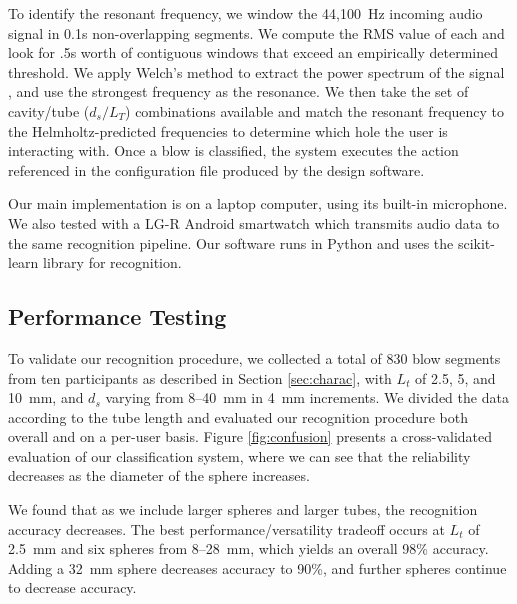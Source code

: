       To identify the resonant frequency, we window the 44,100~Hz incoming audio
      signal in 0.1s non-overlapping segments. We compute the RMS value of each
      and look for .5s worth of contiguous windows that exceed an empirically
      determined threshold. We apply Welch's method to extract the power
      spectrum of the signal \cite{Welch:1967jw}, and use the strongest
      frequency as the resonance. We then take the set of cavity/tube
      ($d_s/L_T$) combinations available and match the resonant frequency to the
      Helmholtz-predicted frequencies to determine which hole the user is
      interacting with. Once a blow is classified, the system executes the
      action referenced in the configuration file produced by the design
      software.
          
      Our main implementation is on a laptop computer, using its built-in
      microphone. We also tested with a LG-R Android smartwatch which transmits
      audio data to the same recognition pipeline. Our software runs in Python
      and uses the scikit-learn library for recognition.
          
    \subsection{Performance Testing}
      To validate our recognition procedure, we collected a total of 830 blow
      segments from ten participants as described in Section \ref{sec:charac},
      with $L_t$ of 2.5, 5, and 10~mm, and $d_s$ varying from 8--40~mm in 4~mm
      increments. We divided the data according to the tube length and evaluated
      our recognition procedure both overall and on a per-user basis.  Figure
      \ref{fig:confusion} presents a cross-validated evaluation of our
      classification system, where we can see that the reliability decreases as
      the diameter of the sphere increases.
          
      We found that as we include larger spheres and larger tubes, the
      recognition accuracy decreases. The best performance/versatility tradeoff
      occurs at $L_t$ of 2.5~mm and six spheres from 8--28~mm, which yields an
      overall 98\% accuracy. Adding a 32~mm sphere decreases accuracy to 90\%,
      and further spheres continue to decrease accuracy.

